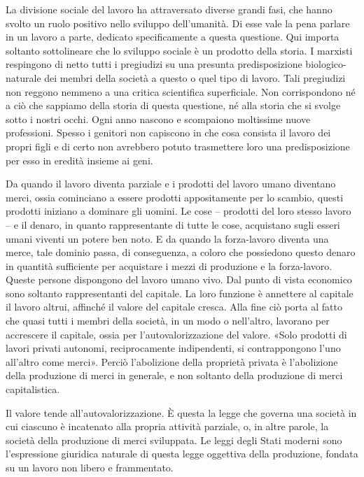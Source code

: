 \documentclass[../main]{subfiles}
\begin{document}
La divisione sociale del lavoro ha attraversato diverse grandi fasi, che hanno svolto un ruolo positivo nello sviluppo dell'umanità. Di esse vale la pena parlare in un lavoro a parte, dedicato specificamente a questa questione. Qui importa soltanto sottolineare che lo sviluppo sociale è un prodotto della storia. I marxisti respingono di netto tutti i pregiudizi su una presunta predisposizione biologico-naturale dei membri della società a questo o quel tipo di lavoro. Tali pregiudizi non reggono nemmeno a una critica scientifica superficiale. Non corrispondono né a ciò che sappiamo della storia di questa questione, né alla storia che si svolge sotto i nostri occhi. Ogni anno nascono e scompaiono moltissime nuove professioni. Spesso i genitori non capiscono in che cosa consista il lavoro dei propri figli e di certo non avrebbero potuto trasmettere loro una predisposizione per esso in eredità insieme ai geni.

Da quando il lavoro diventa parziale e i prodotti del lavoro umano diventano merci, ossia cominciano a essere prodotti appositamente per lo scambio, questi prodotti iniziano a dominare gli uomini. Le cose – prodotti del loro stesso lavoro – e il denaro, in quanto rappresentante di tutte le cose, acquistano sugli esseri umani viventi un potere ben noto. E da quando la forza-lavoro diventa una merce, tale dominio passa, di conseguenza, a coloro che possiedono questo denaro in quantità sufficiente per acquistare i mezzi di produzione e la forza-lavoro. Queste persone dispongono del lavoro umano vivo. Dal punto di vista economico sono soltanto rappresentanti del capitale. La loro funzione è annettere al capitale il lavoro altrui, affinché il valore del capitale cresca. Alla fine ciò porta al fatto che quasi tutti i membri della società, in un modo o nell'altro, lavorano per accrescere il capitale, ossia per l'autovalorizzazione del valore. «Solo prodotti di lavori privati autonomi, reciprocamente indipendenti, si contrappongono l'uno all'altro come merci». Perciò l'abolizione della proprietà privata è l'abolizione della produzione di merci in generale, e non soltanto della produzione di merci capitalistica.

Il valore tende all'autovalorizzazione. È questa la legge che governa una società in cui ciascuno è incatenato alla propria attività parziale, o, in altre parole, la società della produzione di merci sviluppata. Le leggi degli Stati moderni sono l'espressione giuridica naturale di questa legge oggettiva della produzione, fondata su un lavoro non libero e frammentato.
\end{document}
